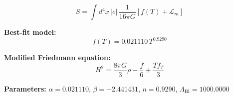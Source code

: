 
\begin{equation}
  S = \int d^4x \, |e| \, \frac{1}{16\pi G} \left[ f(T) + \mathcal{L}_m \right]
\end{equation}

\textbf{Best-fit model:}
\begin{equation}
  f(T) = 0.021110 \, T^{0.9290}
\end{equation}

\textbf{Modified Friedmann equation:}
\begin{equation}
  H^2 = \frac{8\pi G}{3} \rho - \frac{f}{6} + \frac{T f_T}{3}
\end{equation}

\textbf{Parameters:}
$\alpha = 0.021110$, \quad
$\beta = -2.441431$, \quad
$n = 0.9290$, \quad
$\Lambda_{\text{BI}} = 1000.0000$